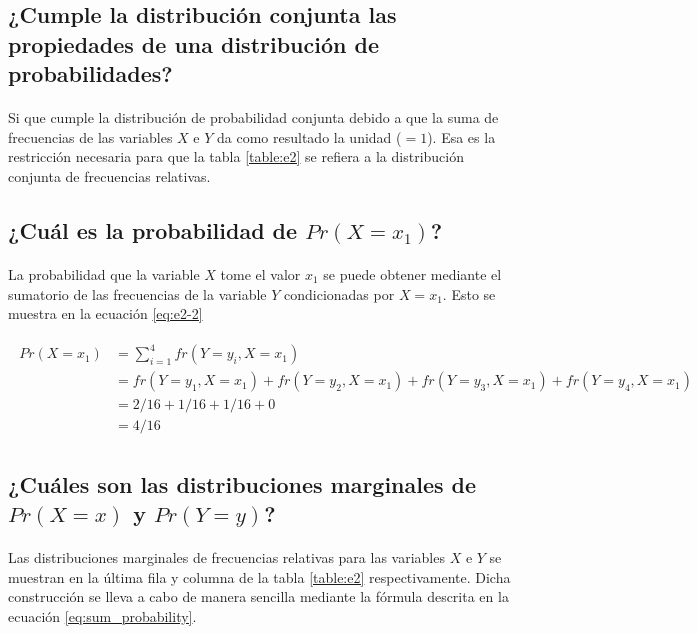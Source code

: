 \documentclass{article}
\begin{document}
		\subsection{¿Cumple la distribución conjunta las propiedades de una distribución de probabilidades?}

			\paragraph{}
			Si que cumple la distribución de probabilidad conjunta debido a que la suma de frecuencias de las variables $X$ e $Y$ da como resultado la unidad ($=1$). Esa es la restricción necesaria para que la tabla \ref{table:e2} se refiera a la distribución conjunta de frecuencias relativas.

		\subsection{¿Cuál es la probabilidad de $Pr(X = x_1)$?}

			\paragraph{}
			La probabilidad que la variable $X$ tome el valor $x_1$ se puede obtener mediante el sumatorio de las frecuencias de la variable $Y$ condicionadas por $X = x_1$. Esto se muestra en la ecuación \eqref{eq:e2-2}

			\begin{align}
			\label{eq:e2-2}
				\begin{split}
				Pr(X = x_1) &= \sum_{i=1}^4fr(Y = y_i, X = x_1) \\
										&= fr(Y = y_1, X = x_1) + fr(Y = y_2, X = x_1) + fr(Y = y_3, X = x_1)+ fr(Y = y_4, X = x_1) \\
										&= 2/16 + 1/16 + 1/16 + 0 \\
										&= 4/16
					\end{split}
			\end{align}

		\subsection{¿Cuáles son las distribuciones marginales de $Pr(X = x)$ y $Pr(Y = y)$?}

			\paragraph{}
			Las distribuciones marginales de frecuencias relativas para las variables $X$ e $Y$ se muestran en la última fila y columna de la tabla \ref{table:e2} respectivamente. Dicha construcción se lleva a cabo de manera sencilla mediante la fórmula descrita en la ecuación \eqref{eq:sum_probability}.
\end{document}
